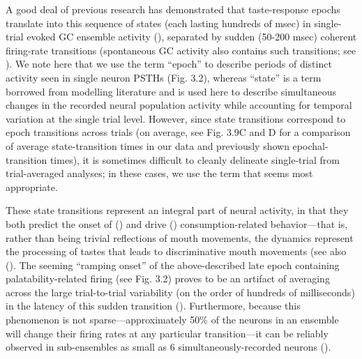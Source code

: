 \begin{refsection}
A good deal of previous research has demonstrated that taste-response epochs translate into this sequence of states (each lasting hundreds of msec) in single-trial evoked GC ensemble activity (\cite{jones2007a,sadacca2016a,mukherjee2019a}), separated by sudden (50-200 msec) coherent firing-rate transitions (spontaneous GC activity also contains such transitions; see \cite{camera2019a,mazzucato2015a}). We note here that we use the term “epoch” to describe periods of distinct activity seen in single neuron PSTHs (Fig. 3.2), whereas “state” is a term borrowed from modelling literature and is used here to describe simultaneous changes in the recorded neural population activity while accounting for temporal variation at the single trial level. However, since state transitions correspond to epoch transitions across trials (on average, see Fig. 3.9C and D for a comparison of average state-transition times in our data and previously shown epochal-transition times), it is sometimes difficult to cleanly delineate single-trial from trial-averaged analyses; in these cases, we use the term that seems most appropriate.

These state transitions represent an integral part of neural activity, in that they both predict the onset of (\cite{sadacca2016a}) and drive (\cite{mukherjee2019a}) consumption-related behavior—that is, rather than being trivial reflections of mouth movements, the dynamics represent the processing of tastes that leads to discriminative mouth movements (see also (\cite{jones2007a,katz2001a}). The seeming “ramping onset” of the above-described late epoch containing palatability-related firing (see Fig. 3.2) proves to be an artifact of averaging across the large trial-to-trial variability (on the order of hundreds of milliseconds) in the latency of this sudden transition (\cite{jones2007a,sadacca2016a}). Furthermore, because this phenomenon is not sparse—approximately 50\% of the neurons in an ensemble will change their firing rates at any particular transition—it can be reliably observed in sub-ensembles as small as 6 simultaneously-recorded neurons (\cite{jones2007a}). 


\end{refsection}
